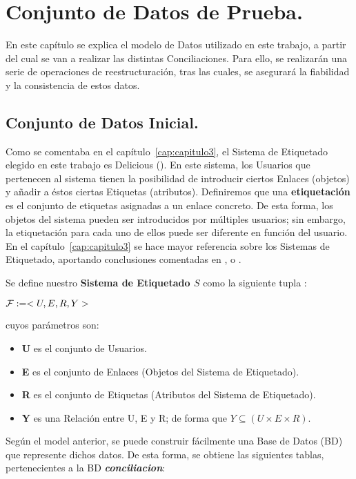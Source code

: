 \chapter{Conjunto de Datos de Prueba.}\label{cap:capitulo5}

En este capítulo se explica el modelo de Datos utilizado en este trabajo, a partir del cual se van a realizar las distintas Conciliaciones. Para ello, se realizarán una serie de operaciones de reestructuración, tras las cuales, se asegurará la fiabilidad y la consistencia de estos datos.
 
\section{Conjunto de Datos Inicial.}

Como se comentaba en el capítulo~\ref{cap:capitulo3}, el Sistema de Etiquetado elegido en este trabajo es Delicious (\cite{delicious}). En este sistema, los Usuarios que pertenecen al sistema tienen la posibilidad de introducir ciertos Enlaces (objetos) y añadir a éstos ciertas Etiquetas (atributos). Definiremos que una {\bf etiquetación} es el conjunto de etiquetas asignadas a un enlace concreto. De esta forma, los objetos del sistema pueden ser introducidos por múltiples usuarios; sin embargo, la etiquetación para cada uno de ellos puede ser diferente en función del usuario. En el capítulo~\ref{cap:capitulo3} se hace mayor referencia sobre los Sistemas de Etiquetado, aportando conclusiones comentadas en \cite{golder}, \cite{smith} o \cite{van}.

Se define nuestro {\bf Sistema de Etiquetado $S$} como la siguiente tupla :
\begin{center}
$ {\cal F} := <U, E, R, Y> $
\end{center}
cuyos parámetros son:

\begin{itemize}
	\item {\bf U} es el conjunto de Usuarios.
	\item {\bf E} es el conjunto de Enlaces (Objetos del Sistema de Etiquetado).
	\item {\bf R} es el conjunto de Etiquetas (Atributos del Sistema de Etiquetado).
	\item {\bf Y} es una Relación entre U, E y R; de forma que $Y \subseteq (U \times{E \times{R}})$.
\end{itemize}

Según el model anterior, se puede construir fácilmente una Base de Datos (BD) que represente dichos datos. De esta forma, se obtiene las siguientes tablas, pertenecientes a la BD \emph{{\bf conciliacion}}:

